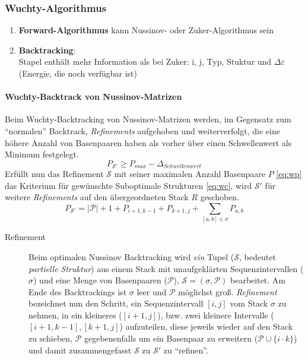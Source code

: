 \subsubsection{Wuchty-Algorithmus}
\begin{enumerate}
\item\textbf{Forward-Algorithmus} kann Nussinov- oder Zuker-Algorithmus sein
\item\textbf{Backtracking}:\\
Stapel enth\"alt mehr Information als bei Zuker:  i, j, Typ, Stuktur und $\Delta\varepsilon$ (Energie, die noch verf\"ugbar ist)
\end{enumerate}

\paragraph{Wuchty-Backtrack von Nussinov-Matrizen}
Beim Wuchty-Backtracking von Nussinov-Matrizen werden, im Gegensatz zum ``normalen''
Backtrack, \emph{Refinements} aufgehoben und weiterverfolgt, die eine h\"ohere Anzahl von Basenpaaren 
haben als vorher \"{u}ber einen Schwellenwert als Minimum festgelegt. 
\begin{equation} \label{eq:wc}
  P_{\mathcal{S}'} \geqslant P_{max}-\Delta_{Schwellenwert}
\end{equation}
Erf\"ullt nun das Refinement $\mathcal{S}$ mit seiner maximalen Anzahl Basenpaare $P$ \eqref{eq:wp} das 
Kriterium f\"ur gew\"unschte Suboptimale Strukturen \eqref{eq:wc}, wird $\mathcal{S}'$ f\"ur weitere 
\emph{Refinements} auf den \"ubergeordneten Stack $R$ geschoben. 
\begin{equation} \label{eq:wp}
	P_{\mathcal{S}'} = |\mathcal{P}| + 1 + P_{i+1,k-1} + P_{k+1,j} + \sum_{[a,b] \in \sigma} P_{a,b}
\end{equation}
\begin{description}
	\item[Refinement] Beim optimalen Nussinov Backtracking wird \emph{ein} Tupel 
		($\mathcal{S}$, bedeutet \emph{partielle Struktur}) aus einem Stack mit 
		unaufgekl\"arten Sequenzintervallen ($\sigma$) und eine Menge von 
		Basenpaaren ($\mathcal{P}$), $\mathcal{S}=(\sigma, \mathcal{P})$ bearbeitet. 
		Am Ende des Backtrackings ist $\sigma$ leer und $\mathcal{P}$ m\"oglichst groß. 
		\emph{Refinement} bezeichnet nun den Schritt, ein Sequenzintervall $[i,j]$ vom 
		Stack $\sigma$ zu nehmen, in ein kleineres ($[i+1,j]$), bzw. zwei kleinere Intervalle 
		($[i+1,k-1], [k+1,j]$) aufzuteilen, diese jeweils wieder auf den Stack zu 
		schieben, $\mathcal{P}$ gegebenenfalls um ein Basenpaar zu erweitern 
		($\mathcal{P} \cup \{i \cdot k\}$) und damit zusammengefasst 
		$\mathcal{S}$ zu $\mathcal{S}'$ zu ``refinen''.
\end{description}

